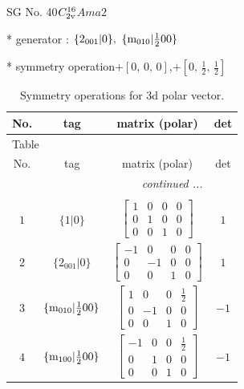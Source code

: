 \documentclass[fleqn,8pt]{jsarticle}
\begin{document}
\setcounter{MaxMatrixCols}{32}

\renewcommand{\tablename}{Table~}
\renewcommand{\figurename}{Figure~}
\begin{center}
\LARGE
SG No. 40\quad$C_{\rm 2v}^{16}$\quad$Ama2$\quad[ orthorhombic ]
\end{center}

* generator : $\{2{}_{001}|0\},\,\,\{{\rm m}_{010}|\frac{1}{2} 0 0\}$

* symmetry operation\quad$+\left[ 0,\, 0,\, 0 \right]$,\quad $+\left[ 0,\, \frac{1}{2},\, \frac{1}{2} \right]$
\renewcommand{\arraystretch}{1.3}
\begin{longtable}{cccc}
\caption{Symmetry operations for 3d polar vector.}
 \\
 \hline \hline
No. & tag & matrix (polar) & det \\ \hline \endfirsthead

\multicolumn{3}{l}{\tablename\ \thetable{}} \\
 \hline \hline
No. & tag & matrix (polar) & det \\ \hline \endhead

 \hline \hline
\multicolumn{3}{r}{\footnotesize\it continued ...} \\ \endfoot

 \hline \hline
\multicolumn{3}{r}{} \\ \endlastfoot

$ 1 $ & $ \{1|0\} $ & $ \begin{bmatrix} 1 & 0 & 0 & 0 \\ 0 & 1 & 0 & 0 \\ 0 & 0 & 1 & 0 \end{bmatrix} $ & $ 1 $ \\ \hline
$ 2 $ & $ \{2{}_{001}|0\} $ & $ \begin{bmatrix} -1 & 0 & 0 & 0 \\ 0 & -1 & 0 & 0 \\ 0 & 0 & 1 & 0 \end{bmatrix} $ & $ 1 $ \\ \hline
$ 3 $ & $ \{{\rm m}_{010}|\frac{1}{2} 0 0\} $ & $ \begin{bmatrix} 1 & 0 & 0 & \frac{1}{2} \\ 0 & -1 & 0 & 0 \\ 0 & 0 & 1 & 0 \end{bmatrix} $ & $ -1 $ \\ \hline
$ 4 $ & $ \{{\rm m}_{100}|\frac{1}{2} 0 0\} $ & $ \begin{bmatrix} -1 & 0 & 0 & \frac{1}{2} \\ 0 & 1 & 0 & 0 \\ 0 & 0 & 1 & 0 \end{bmatrix} $ & $ -1 $ \\
\end{longtable}
\end{document}
